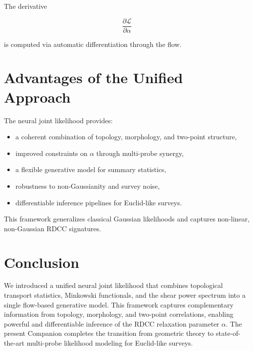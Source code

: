 \documentclass[11pt,a4paper]{article}
\begin{document}
The derivative



\[
    \frac{\partial \mathcal{L}}{\partial \alpha}
\]



is computed via automatic differentiation through the flow.
\section{Advantages of the Unified Approach}

The neural joint likelihood provides:

\begin{itemize}
    \item a coherent combination of topology, morphology, and two-point structure,
    \item improved constraints on $\alpha$ through multi-probe synergy,
    \item a flexible generative model for summary statistics,
    \item robustness to non-Gaussianity and survey noise,
    \item differentiable inference pipelines for Euclid-like surveys.
\end{itemize}

This framework generalizes classical Gaussian likelihoods and captures 
non-linear, non-Gaussian RDCC signatures.
\section{Conclusion}

We introduced a unified neural joint likelihood that combines topological 
transport statistics, Minkowski functionals, and the shear power spectrum into a 
single flow-based generative model. This framework captures complementary 
information from topology, morphology, and two-point correlations, enabling 
powerful and differentiable inference of the RDCC relaxation parameter $\alpha$. 
The present Companion completes the transition from geometric theory to 
state-of-the-art multi-probe likelihood modeling for Euclid-like surveys.


\nocite{*}

\end{document}
